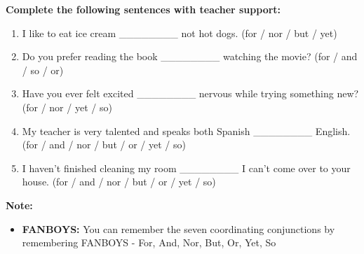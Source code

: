 \documentclass[12pt]{article}
\begin{document}
\begin{tcolorbox}[colframe=black!60, colback=white, 
coltitle=black, colbacktitle=black!15, fonttitle=\bfseries\Large, 
title=Guided Practice, halign title=center, left=10pt, right=10pt, top=10pt, bottom=15pt]
\textbf{Complete the following sentences with teacher support:}
\begin{enumerate}[itemsep=3em] %
    \item I like to eat ice cream  \_\_\_\_\_\_\_\_ not hot dogs. (for / nor / but / yet)
    \item     Do you prefer reading the book \_\_\_\_\_\_\_\_ watching the movie? (for / and / so / or)
    \item Have you ever felt excited \_\_\_\_\_\_\_\_ nervous while trying something new? (for / nor / yet / so)
    \item My teacher is very talented and speaks both Spanish \_\_\_\_\_\_\_\_ English.  (for / and / nor / but / or / yet / so)
    \item I haven't finished cleaning my room \_\_\_\_\_\_\_\_ I can't come over to your house.   (for / and / nor / but / or / yet / so)

\end{enumerate}
\end{tcolorbox}

\vspace{1em}

\begin{tcolorbox}[colframe=black!40, colback=gray!5, 
coltitle=black, colbacktitle=black!20, fonttitle=\bfseries\Large, 
title=Additional Notes, halign title=center, left=5pt, right=5pt, top=5pt, bottom=15pt]
\textbf{Note:}
\begin{itemize}
    \item \textbf{FANBOYS:} You can remember the seven coordinating conjunctions by remembering FANBOYS - For, And, Nor, But, Or, Yet, So


\end{itemize}
\end{tcolorbox}

\vspace{1em}
\end{document}
